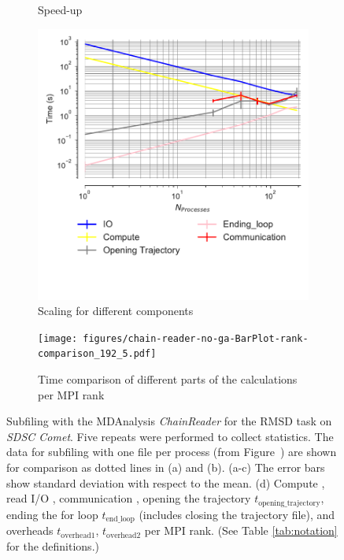 \begin{figure}[!htb]
\begin{subfigure}{.4\textwidth}
  \caption{Speed-up}
  \label{fig:MPIspeedup-chain-reader}
\end{subfigure}
\bigskip
\begin{subfigure}{.45\textwidth}
  \includegraphics[width=\linewidth]{figures/IO_compute_scaling_traj_splitting-chain-reader.pdf}
  \captionsetup{format=hang}
  \caption{Scaling for different components}
  \label{fig:MPIscaling-chain-reader}
\end{subfigure}
\hfill
\begin{subfigure}{.5\textwidth}
  \texttt{[image: figures/chain-reader-no-ga-BarPlot-rank-comparison\_192\_5.pdf]}
  \captionsetup{format=hang}
  \caption{Time comparison of different parts of the calculations per MPI rank}
  \label{fig:MPIranks-split-chain-reader}
\end{subfigure}

\caption{Subfiling with the MDAnalysis \emph{ChainReader} for the RMSD task on \emph{SDSC Comet}.
Five repeats were performed to collect statistics.
The data for subfiling with one file per process (from Figure~\protect{\ref{fig:MPIwithIO-split}}) are shown for comparison as dotted lines in (a) and (b).  
(a-c) The error bars show standard deviation with respect to the mean.
(d) Compute \tcomp, read I/O \tIO, communication \tcomm, opening the trajectory $t_{\text{opening\_trajectory}}$, ending the for loop $t_{\text{end\_loop}}$ (includes closing the trajectory file),  and overheads $t_{\text{overhead1}}$, $t_{\text{overhead2}}$ per MPI rank. (See Table \ref{tab:notation} for the definitions.)}
\label{fig:MPIwithIO-split-chain-reader}
\end{figure}

